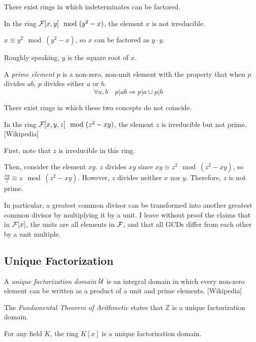 There exist rings in which indeterminates can be factored.

\example
In the ring ${\cal F}[x,y] \mod (y^2-x)$, the element $x$ is
not irreducible.

$x \equiv y^2 \mod (y^2-x)$, so $x$ can be factored as
$y\cdot y$.

Roughly speaking, $y$ is the square root of $x$.
\endexample

\begin{key point}
A {\it prime element} $p$ is a non-zero, non-unit element with
the property that when $p$ divides $ab$, $p$ divides either $a$ or $b$.
$$\forall a,b \quad p|ab \Rightarrow p|a \cup p|b$$
\end{key point}

There exist rings in which these two concepts do not coincide.

\example
In the ring ${\cal F}[x,y,z] \mod (z^2-xy)$, the element $z$ is
irreducible but not prime.  [Wikipedia]

First, note that $z$ is irreducible in this ring.

Then, consider the element $xy$.  $z$ divides $xy$ since
$xy \equiv z^2 \mod (z^2-xy)$, so $\frac{xy}{z} \equiv z \mod (z^2-xy)$.
However, $z$ divides neither $x$ nor $y$.
Therefore, $z$ is not prime.
\endexample



In particular, a greatest common divisor can be transformed into
another greatest common divisor by multiplying it by a unit.  I leave
without proof the claims that in ${\cal F}[x]$, the units are all
elements in ${\cal F}$, and that all GCDs differ from each other by a
unit multiple.

\subsection*{\qquad Unique Factorization}

\begin{key point}
A {\it unique factorization domain} ${\cal U}$
is an integral domain in which every non-zero element can be written as a product of a unit and prime elements.
[Wikipedia]
\end{key point}


The {\it Fundamental Theorem of Arithmetic} states that ${\mathbb Z}$
is a unique factorization domain.

\theorem

For any field $K$, the ring $K[x]$ is a unique factorization domain.

